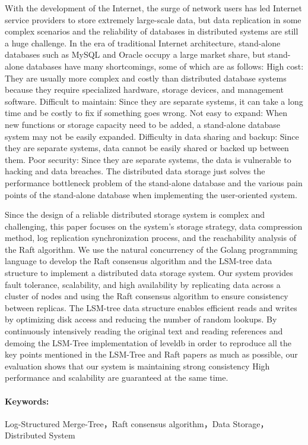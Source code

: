 With the development of the Internet, the surge of network users has led Internet service providers to store extremely large-scale data, but data replication in some complex scenarios and the reliability of databases in distributed systems are still a huge challenge.
In the era of traditional Internet architecture, stand-alone databases such as MySQL and Oracle occupy a large market share, but stand-alone databases have many shortcomings, some of which are as follows:
High cost: They are usually more complex and costly than distributed database systems because they require specialized hardware, storage devices, and management software.
Difficult to maintain: Since they are separate systems, it can take a long time and be costly to fix if something goes wrong.
Not easy to expand: When new functions or storage capacity need to be added, a stand-alone database system may not be easily expanded.
Difficulty in data sharing and backup: Since they are separate systems, data cannot be easily shared or backed up between them.
Poor security: Since they are separate systems, the data is vulnerable to hacking and data breaches.
The distributed data storage just solves the performance bottleneck problem of the stand-alone database and the various pain points of the stand-alone database when implementing the user-oriented system.


Since the design of a reliable distributed storage system is complex and challenging, this paper focuses on the system's storage strategy, data compression method, log replication synchronization process, and the reachability analysis of the Raft algorithm.
We use the natural concurrency of the Golang programming language to develop the Raft consensus algorithm and the LSM-tree data structure to implement a distributed data storage system.
Our system provides fault tolerance, scalability, and high availability by replicating data across a cluster of nodes and using the Raft consensus algorithm to ensure consistency between replicas. The LSM-tree data structure enables efficient reads and writes by optimizing disk access and reducing the number of random lookups.
By continuously intensively reading the original text and reading references and demoing the LSM-Tree implementation of leveldb in order to reproduce all the key points mentioned in the LSM-Tree and Raft papers as much as possible, our evaluation shows that our system is maintaining strong consistency High performance and scalability are guaranteed at the same time.
	
\paragraph{Keywords: }Log-Structured Merge-Tree，Raft consensus algorithm，Data Storage，Distributed System 






